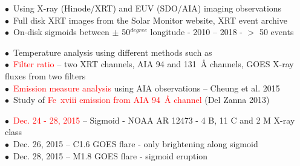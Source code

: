 \documentclass{beamer}
\begin{document}
\begin{frame}
 
 \vspace{-2mm}
 \begin{tcolorbox}[title = \bf Data collection, beforeafter skip=5mm, beforeafter = 10mm, right = 1mm,colframe=blue!50!black]
\scriptsize  $\bullet$~Using X-ray (Hinode/XRT) and EUV (SDO/AIA) imaging observations \\
             $\bullet$~Full disk XRT images from the Solar Monitor website, XRT event archive \\
             $\bullet$~On-disk sigmoids between $\pm$ 50$^{degree}$ longitude - 2010 – 2018 - $>$ 50 events
\end{tcolorbox}

\begin{tcolorbox}[title = \bf Methodology, beforeafter skip=5mm, beforeafter = 10mm, right = 1mm,colframe=blue!50!black]
\scriptsize  $\bullet$~Temperature analysis using different methods such as \\
             $\bullet$~\textcolor{red}{Filter ratio} -- two XRT channels, AIA 94 and 131~{\AA} channels,
GOES X-ray fluxes from two filters \\
             $\bullet$~\textcolor{red}{Emission measure analysis} using AIA observations -- Cheung et al. 2015 \\
             $\bullet$~Study of \textcolor{red}{Fe~{\sc xviii} emission from AIA 94~{\AA} channel} (Del Zanna 2013)
\end{tcolorbox}

\begin{tcolorbox}[title = \textbf{Sigmoid observation}, beforeafter skip=5mm, beforeafter = 10mm, right = 1mm,colframe=blue!50!black]
\scriptsize  $\bullet$~\textcolor{red}{Dec. 24 - 28, 2015} -- Sigmoid - NOAA AR 12473 - 4 B, 11 C and 2 M X-ray class \\
\scriptsize  $\bullet$~Dec. 26, 2015 -- C1.6 GOES flare - only brightening along sigmoid \\
\scriptsize  $\bullet$~Dec. 28, 2015 -- M1.8 GOES flare - sigmoid eruption \\
\end{tcolorbox}

\end{frame}


\end{document}
